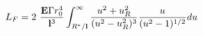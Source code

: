\begin{equation}
L_F= 2\ \frac{{\bf E}\Gamma r_0^4}{{\bf l}^3}\int_{R^*/{\bf l}}^\infty 
\frac{u^2+u_R^2}{(u^2-u_R^2)^3}
\frac{u }{(u^2-1)^{1/2}}du 
\end{equation}

